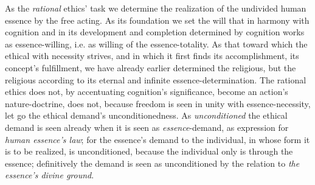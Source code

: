 \documentclass[12pt,a4paper]{book}
\begin{document}
As the \emph{rational} ethics' task we determine the realization of the undivided human essence by the free
acting. As its foundation we set the will that in harmony with cognition and in its development and
completion determined by cognition works as essence-willing, i.e. as willing of the essence-totality.
As that toward which the ethical with necessity strives, and in which it first finds its
accomplishment, its concept's fulfillment, we have already earlier determined the religious, but the
religious according to its eternal and infinite essence-determination. The rational ethics does not,
by accentuating cognition's significance, become an action's nature-doctrine, does not, because freedom
is seen in unity with essence-necessity, let go the ethical demand's unconditionedness. As \emph{unconditioned}
the ethical demand is seen already when it is seen as \emph{essence}-demand, as expression for \emph{human
essence's law}; for the essence's demand to the individual, in whose form it is to be realized, is
unconditioned, because the individual only is through the essence; definitively the demand is seen as
unconditioned by the relation to \emph{the essence's divine ground}.
\end{document}
